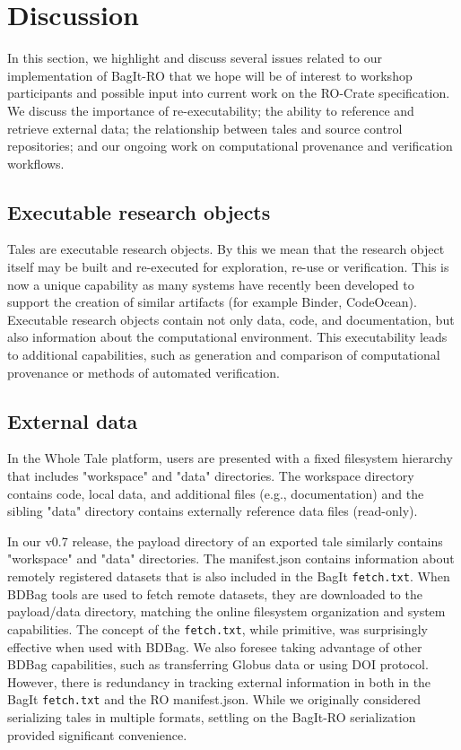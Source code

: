 \documentclass[conference]{IEEEtran}
\begin{document}
\section{Discussion} \label{discussion}

In this section, we highlight and discuss several issues related to our implementation of BagIt-RO that we hope will be of interest to workshop participants and possible input into current work on the RO-Crate specification. We discuss the importance of re-executability; the ability to reference and retrieve external data; the relationship between tales and source control repositories; and our ongoing work on computational provenance and verification workflows.

\subsection{Executable research objects}
Tales are executable research objects. By this we mean that the research object itself may be built and re-executed for exploration, re-use or verification. This is now a unique capability as many systems have recently been developed to support the creation of similar artifacts (for example Binder, CodeOcean).  Executable research objects contain not only data, code, and documentation, but also information about the computational environment. This executability leads to additional capabilities, such as generation and comparison of computational provenance or methods of automated verification.

\subsection{External data}
In the Whole Tale platform, users are presented with a fixed filesystem hierarchy that includes  
"workspace" and "data" directories. The workspace directory contains code, local data, and 
additional files (e.g., documentation) and the sibling "data" directory contains externally 
reference data files (read-only).

In our v0.7 release, the payload directory of an exported tale similarly contains "workspace" and 
"data" directories. The manifest.json contains information about remotely registered datasets that 
is also included in the BagIt \texttt{fetch.txt}.  When BDBag tools are used to fetch remote datasets, they 
are downloaded to the payload/data directory, matching the online filesystem organization and 
system capabilities.  The concept of the \texttt{fetch.txt}, while primitive, was surprisingly effective 
when used with BDBag. We also foresee taking advantage of other BDBag capabilities, such as 
transferring Globus data or using DOI protocol. However, there is redundancy in tracking external 
information in both in the BagIt \texttt{fetch.txt} and the RO manifest.json. While we originally 
considered serializing tales in multiple formats, settling on the BagIt-RO serialization provided 
significant convenience.
\end{document}
